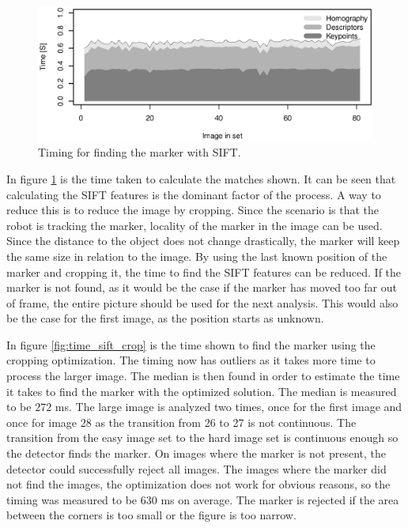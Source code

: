 \begin{figure}[h]
 \centering
 \includegraphics[width=\fullImageWidth]{graphics/marker3_timing_unoptimized}
 \caption{Timing for finding the marker with SIFT.}
 \label{fig:time_sift_unoptimized}
\end{figure}

In figure \ref{fig:time_sift_unoptimized} is the time taken to calculate the matches shown.
It can be seen that calculating the SIFT features is the dominant factor of the process.
A way to reduce this is to reduce the image by cropping.
Since the scenario is that the robot is tracking the marker, locality of the marker in the image can be used.
Since the distance to the object does not change drastically, the marker will keep the same size in relation to the image.
By using the last known position of the marker and cropping it, the time to find the SIFT features can be reduced.
If the marker is not found, as it would be the case if the marker has moved too far out of frame, the entire picture should be used for the next analysis.
This would also be the case for the first image, as the position starts as unknown.

In figure \ref{fig:time_sift_crop} is the time shown to find the marker using the cropping optimization.
The timing now has outliers as it takes more time to process the larger image.
The median is then found in order to estimate the time it takes to find the marker with the optimized solution.
The median is measured to be $272$ ms.
The large image is analyzed two times, once for the first image and once for image 28 as the transition from 26 to 27 is not continuous.
The transition from the easy image set to the hard image set is continuous enough so the detector finds the marker.
On images where the marker is not present, the detector could successfully reject all images.
The images where the marker did not find the images, the optimization does not work for obvious reasons, so the timing was measured to be $630$ ms on average.
The marker is rejected if the area between the corners is too small or the figure is too narrow.

